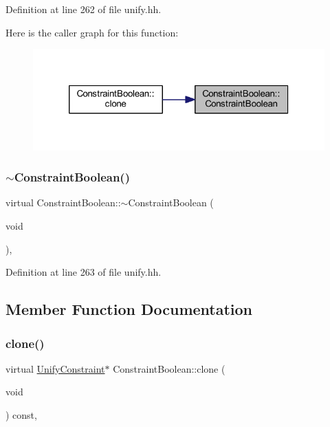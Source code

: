 Definition at line 262 of file unify.\+hh.

Here is the caller graph for this function\+:
\nopagebreak
\begin{figure}[H]
\begin{center}
\leavevmode
\includegraphics[width=320pt]{class_constraint_boolean_ad74ce76959983eefb4c7cba1f3ccf353_icgraph}
\end{center}
\end{figure}
\mbox{\label{class_constraint_boolean_a2b7fbb518bbd7819780e645090284c69}} 
\subsubsection{\texorpdfstring{$\sim$ConstraintBoolean()}{~ConstraintBoolean()}}
{\footnotesize\ttfamily virtual Constraint\+Boolean\+::$\sim$\+Constraint\+Boolean (\begin{DoxyParamCaption}\item[{void}]{ }\end{DoxyParamCaption})\hspace{0.3cm}{\ttfamily [inline]}, {\ttfamily [virtual]}}



Definition at line 263 of file unify.\+hh.



\subsection{Member Function Documentation}
\mbox{\label{class_constraint_boolean_a3b258aaef6abed8c36455b562016cfbc}} 
\subsubsection{\texorpdfstring{clone()}{clone()}}
{\footnotesize\ttfamily virtual \mbox{\hyperlink{class_unify_constraint}{Unify\+Constraint}}$\ast$ Constraint\+Boolean\+::clone (\begin{DoxyParamCaption}\item[{void}]{ }\end{DoxyParamCaption}) const\hspace{0.3cm}{\ttfamily [inline]}, {\ttfamily [virtual]}}



